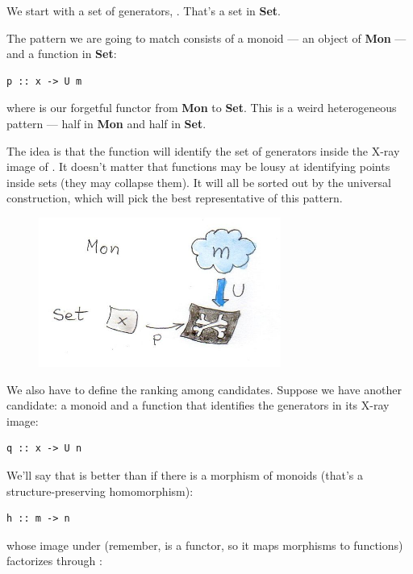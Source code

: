 We start with a set of generators, . That's a set in
\textbf{Set}.

The pattern we are going to match consists of a monoid  --- an
object of \textbf{Mon} --- and a function  in \textbf{Set}:

\begin{Verbatim}[commandchars=\\\{\}]
p :: x -> U m
\end{Verbatim}
where  is our forgetful functor from \textbf{Mon} to
\textbf{Set}. This is a weird heterogeneous pattern --- half in
\textbf{Mon} and half in \textbf{Set}.

The idea is that the function  will identify the set of
generators inside the X-ray image of . It doesn't matter that
functions may be lousy at identifying points inside sets (they may
collapse them). It will all be sorted out by the universal construction,
which will pick the best representative of this pattern.

\begin{figure}[H]
\centering
\includegraphics[width=3.12500in]{images/monoid-pattern.jpg}
\end{figure}

\noindent
We also have to define the ranking among candidates. Suppose we have
another candidate: a monoid  and a function that identifies
the generators in its X-ray image:

\begin{Verbatim}[commandchars=\\\{\}]
q :: x -> U n
\end{Verbatim}
We'll say that  is better than  if there is a
morphism of monoids (that's a structure-preserving homomorphism):

\begin{Verbatim}[commandchars=\\\{\}]
h :: m -> n
\end{Verbatim}
whose image under  (remember,  is a functor, so it
maps morphisms to functions) factorizes through :


